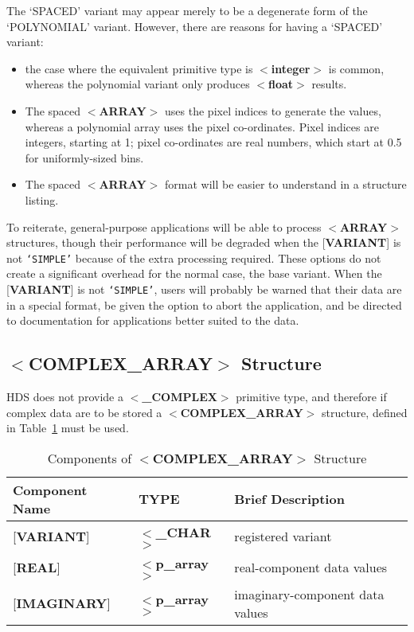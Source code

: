\documentclass[twoside,11pt,nolof,noabs]{starlink}
\begin{document}
The `SPACED' variant may appear merely
to be a degenerate form of the `POLYNOMIAL' variant.  However, there are reasons for
having a `SPACED' variant:
\begin{itemize}
\item the case where the equivalent primitive type is $<$\textbf{integer}$>$ is common, whereas the polynomial variant only produces
$<$\textbf{float}$>$ results.
\item The spaced $<$\textbf{ARRAY}$>$ uses the pixel indices
to generate the values, whereas a
polynomial array uses the pixel co-ordinates.  Pixel
indices are integers, starting at 1; pixel
co-ordinates are real numbers, which start at 0.5
for uniformly-sized bins.
\item The spaced $<$\textbf{ARRAY}$>$ format will be easier to understand
in a structure listing.
\end{itemize}

To reiterate, general-purpose applications will be able to process
\mbox{$<$\textbf{ARRAY}$>$} structures, though their performance will be
degraded when the {[}\textbf{VARIANT}{]} is not \texttt{`SIMPLE'} because of
the extra processing required. These options do not create a significant
overhead for the normal case, the base variant.
When the {[}\textbf{VARIANT}{]} is not \texttt{`SIMPLE'},
users will probably be warned that their data are in a special format,
be given the option to abort the application, and be directed to
documentation for applications better suited to the data.

\subsection{$<$\textbf{COMPLEX\_ARRAY}$>$ Structure\label{se:scomplex}}

HDS does not provide a $<$\textbf{\_COMPLEX}$>$ primitive type, and
therefore if complex data are to be stored a $<$\textbf{COMPLEX\_ARRAY}$>$
structure, defined in Table~\ref{ta:complex} must be used.

\begin{table}
\centering
\caption{Components of $<$\textbf{COMPLEX\_ARRAY}$>$ Structure}
\label{ta:complex}
\begin{tabular}{|l|l|l|}
\hline
Component Name & TYPE & Brief Description \\ \hline
{[}\textbf{VARIANT}{]} & $<$\textbf{\_CHAR}$>$ & registered variant \\
{[}\textbf{REAL}{]} & $<$\textbf{p\_array}$>$ & real-component data values  \\
{[}\textbf{IMAGINARY}{]} & $<$\textbf{p\_array}$>$ & imaginary-component data values \\ \hline
\end{tabular}
\end{table}
\end{document}
